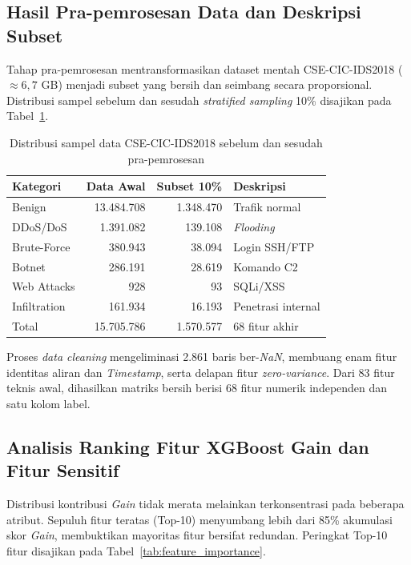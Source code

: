 \documentclass[10pt,twocolumn,a4paper]{extarticle}
\begin{document}
\subsection{Hasil Pra-pemrosesan Data dan Deskripsi Subset}
Tahap pra-pemrosesan mentransformasikan dataset mentah CSE-CIC-IDS2018 ($\approx 6{,}7$ GB) menjadi subset yang bersih dan seimbang secara proporsional. Distribusi sampel sebelum dan sesudah \textit{stratified sampling} 10\% disajikan pada Tabel~\ref{tab:distribusi_dataset}.

\begin{table}[htbp]
\caption{Distribusi sampel data CSE-CIC-IDS2018 sebelum dan sesudah pra-pemrosesan}
\label{tab:distribusi_dataset}
\centering
\footnotesize
\begin{tabularx}{\linewidth}{@{} l r r X @{}}
\toprule
\textbf{Kategori} & \textbf{Data Awal} & \textbf{Subset 10\%} & \textbf{Deskripsi} \\ \midrule
Benign & 13.484.708 & 1.348.470 & Trafik normal \\
DDoS/DoS & 1.391.082 & 139.108 & \textit{Flooding} \\
Brute-Force & 380.943 & 38.094 & Login SSH/FTP \\
Botnet & 286.191 & 28.619 & Komando C2 \\
Web Attacks & 928 & 93 & SQLi/XSS \\
Infiltration & 161.934 & 16.193 & Penetrasi internal \\ \midrule
Total & 15.705.786 & 1.570.577 & 68 fitur akhir \\ \bottomrule
\end{tabularx}
\end{table}

Proses \textit{data cleaning} mengeliminasi 2.861 baris ber-\textit{NaN}, membuang enam fitur identitas aliran dan \textit{Timestamp}, serta delapan fitur \textit{zero-variance}. Dari 83 fitur teknis awal, dihasilkan matriks bersih berisi 68 fitur numerik independen dan satu kolom label.

\subsection{Analisis Ranking Fitur XGBoost Gain dan Fitur Sensitif}
Distribusi kontribusi \textit{Gain} tidak merata melainkan terkonsentrasi pada beberapa atribut. Sepuluh fitur teratas (Top-10) menyumbang lebih dari 85\% akumulasi skor \textit{Gain}, membuktikan mayoritas fitur bersifat redundan. Peringkat Top-10 fitur disajikan pada Tabel~\ref{tab:feature_importance}.
\end{document}
